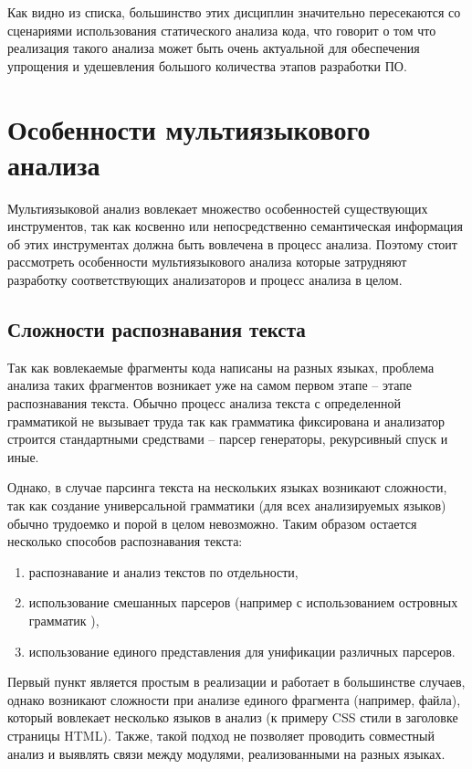 Как видно из списка, большинство этих дисциплин значительно пересекаются со сценариями использования
статического анализа кода, что говорит о том что реализация такого анализа может быть очень актуальной
для обеспечения упрощения и удешевления большого количества этапов разработки ПО.

\section{Особенности мультиязыкового анализа} \label{ssec:num1}

Мультиязыковой анализ вовлекает множество особенностей существующих инструментов, так как косвенно или
непосредственно семантическая информация об этих инструментах должна быть вовлечена в процесс анализа.
Поэтому стоит рассмотреть особенности мультиязыкового анализа которые затрудняют разработку соответствующих
анализаторов и процесс анализа в целом.

\subsection{Сложности распознавания текста} \label{ssec:parsing-problem}

Так как вовлекаемые фрагменты кода написаны на разных языках, проблема анализа таких фрагментов
возникает уже на самом первом этапе -- этапе распознавания текста. Обычно процесс анализа
текста с определенной грамматикой не вызывает труда так как грамматика фиксирована и анализатор строится
стандартными средствами -- парсер генераторы, рекурсивный спуск и иные. 

Однако, в случае парсинга текста на нескольких языках возникают сложности, так как создание универсальной
грамматики (для всех анализируемых языков) обычно трудоемко и порой в целом невозможно. Таким образом остается
несколько способов распознавания текста:
\begin{enumerate}[1)]
    \item распознавание и анализ текстов по отдельности,
    \item использование смешанных парсеров (например с использованием островных грамматик \cite{island-grammars}),
    \item использование единого представления для унификации различных парсеров.
\end{enumerate}

Первый пункт является простым в реализации и работает в большинстве случаев, однако
возникают сложности при анализе единого фрагмента (например, файла), который вовлекает несколько
языков в анализ (к примеру CSS стили в заголовке страницы HTML). Также, такой подход не позволяет
проводить совместный анализ и выявлять связи между модулями, реализованными на разных языках.

